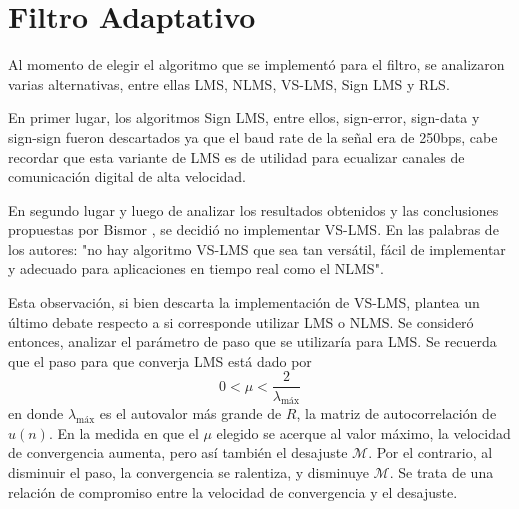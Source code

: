 \documentclass[main.tex]{subfiles}
\begin{document}
\section{Filtro Adaptativo}
Al momento de elegir el algoritmo que se implementó para el filtro, 
se analizaron varias alternativas, entre ellas LMS, NLMS, VS-LMS, Sign LMS y RLS.

En primer lugar, los algoritmos Sign LMS, entre ellos, sign-error, sign-data
y sign-sign fueron descartados ya que el baud rate de la señal era de 250bps,
cabe recordar que esta variante de LMS es de utilidad para ecualizar canales de
comunicación digital de alta velocidad. 

En segundo lugar y  luego de analizar 
los resultados obtenidos y las conclusiones propuestas por Bismor \cite{bismor},
se decidió no implementar VS-LMS. En las palabras de los autores: 
"no hay algoritmo VS-LMS que sea tan versátil, fácil de implementar y adecuado 
para aplicaciones en tiempo real como el NLMS".\newline

Esta observación, si bien descarta la implementación de VS-LMS, 
plantea un último debate respecto a si corresponde utilizar LMS o NLMS. 
Se consideró entonces, analizar el parámetro de paso que se utilizaría para LMS. 
Se recuerda que el paso para que converja LMS está dado por
\begin{equation}
    0<\mu<\frac{2}{\lambda_\text{máx}}
\end{equation}
en donde $\lambda_\text{máx}$ es el autovalor más grande de $R$, la matriz de 
autocorrelación de $u(n)$. En la medida en que el  $\mu$ elegido se acerque 
al valor máximo, la velocidad de convergencia aumenta, pero así también el desajuste $\mathscr{M}$.
Por el contrario, al disminuir el paso, la convergencia se ralentiza, y disminuye $\mathscr{M}$. 
Se trata de una relación de compromiso entre la velocidad de convergencia y el desajuste.
\end{document}
